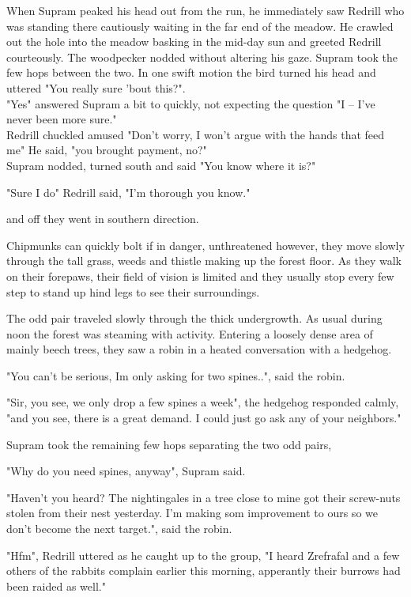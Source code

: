 \documentclass[smalldemyvopaper,11pt,twoside,onecolumn,openright,extrafontsizes]{memoir}
\newlength\drop
\begin{document}
When Supram peaked his head out from the run, he immediately saw Redrill who was standing there cautiously waiting in the far end of the meadow. He crawled out the hole into the meadow basking in the mid-day sun and greeted Redrill courteously. The woodpecker nodded without altering his gaze. Supram took the few hops between the two. In one swift motion the bird turned his head and uttered "You really sure 'bout this?".\\

"Yes" answered Supram a bit to quickly, not expecting the question "I -- I've never been more sure."\\

Redrill chuckled amused "Don't worry, I won't argue with the hands that feed me" He said, "you brought payment, no?"\\

Supram nodded, turned south and said "You know where it is?"

"Sure I do" Redrill said, "I'm thorough you know."

and off they went in southern direction.

Chipmunks can quickly bolt if in danger, unthreatened however, they move slowly through the tall grass, weeds and thistle making up the forest floor. As they walk on their forepaws, their field of vision is limited and they usually stop every few step to stand up hind legs to see their surroundings.

The odd pair traveled slowly through the thick undergrowth. As usual during noon the forest was steaming with activity.
Entering a loosely dense area of mainly beech trees, they saw a robin in a heated conversation with a hedgehog.

"You can't be serious, Im only asking for two spines..", said the robin.

"Sir, you see, we only drop a few spines a week", the hedgehog responded calmly, "and you see, there is a great demand. I could just go ask any of your neighbors."

Supram took the remaining few hops separating the two odd pairs,

"Why do you need spines, anyway", Supram said.

"Haven't you heard? The nightingales in a tree close to mine got their screw-nuts stolen from their nest yesterday. I'm making
som improvement to ours so we don't become the next target.", said the robin.

"Hfm", Redrill uttered as he caught up to the group, "I heard Zrefrafal and a few others of the rabbits complain earlier this morning, apperantly their burrows had been raided as well."\\
\end{document}
